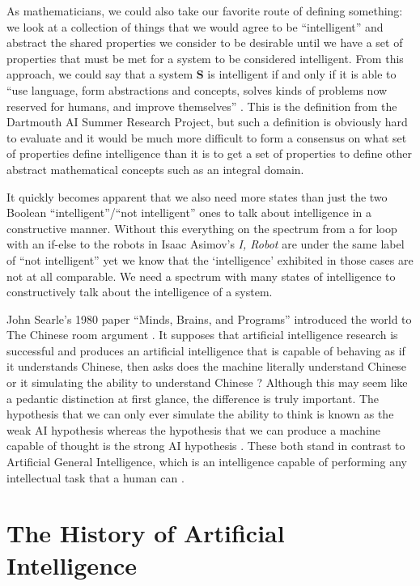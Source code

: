\documentclass[oneside,12pt,openany]{book}
\begin{document}
	As mathematicians, we could also take our favorite route of defining something: we look at a collection of things that we would agree to be ``intelligent'' and abstract the shared properties we consider to be desirable until we have a set of properties that must be met for a system to be considered intelligent. From this approach, we could say that a system \textbf{S} is intelligent if and only if it is able to ``use language, form abstractions and concepts, solves kinds of problems now reserved for humans, and improve themselves'' \cite{Jones}. This is the definition from the Dartmouth AI Summer Research Project, but such a definition is obviously hard to evaluate and it would be much more difficult to form a consensus on what set of properties define intelligence than it is to get a set of properties to define other abstract mathematical concepts such as an integral domain.
	
	It quickly becomes apparent that we also need more states than just the two Boolean ``intelligent''/``not intelligent'' ones to talk about intelligence in a constructive manner. Without this everything on the spectrum from a for loop with an if-else to the robots in Isaac Asimov's \textit{I, Robot}  are under the same label of ``not intelligent'' yet we know that the `intelligence' exhibited in those cases are not at all comparable. We need a spectrum with many states of intelligence to constructively talk about the intelligence of a system.
	
	John Searle's 1980 paper ``Minds, Brains, and Programs'' introduced the world to The Chinese room argument \cite{Searle}. It supposes that artificial intelligence research is successful and produces an artificial intelligence that is capable of behaving as if it understands Chinese, then asks does the machine literally understand Chinese or it simulating the ability to understand Chinese \cite{Searle}? Although this may seem like a pedantic distinction at first glance, the difference is truly important. The hypothesis that we can only ever simulate the ability to think is known as the weak AI hypothesis whereas the hypothesis that we can produce a machine capable of thought is the strong AI hypothesis \cite{Jones}. These both stand in contrast to Artificial General Intelligence, which is an intelligence capable of performing any intellectual task that a human can \cite{Buchanan}.
	
	\section{The History of Artificial Intelligence}
	
\end{document}
